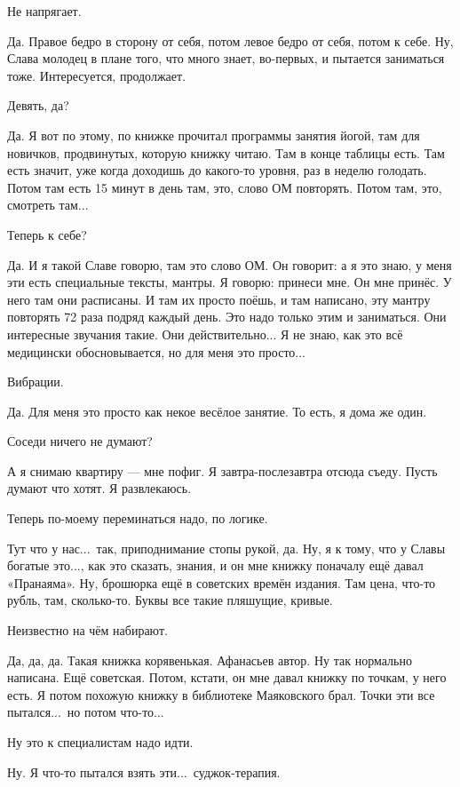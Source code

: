 \M
Не напрягает.

\I
Да. Правое бедро в сторону от себя, потом левое бедро от себя, потом к себе.
Ну, Слава молодец в плане того, что много знает, во-первых, и пытается заниматься тоже.
Интересуется, продолжает.

\M
Девять, да?

\I
Да. Я вот по этому, по книжке прочитал программы занятия йогой, там для новичков,
продвинутых, которую книжку читаю. Там в конце таблицы есть.
Там есть значит, уже когда доходишь до какого-то уровня, раз в неделю голодать.
Потом там есть 15 минут в день там, это, слово ОМ повторять.
Потом там, это, смотреть там...

\M
Теперь к себе?

\I
Да. И я такой Славе говорю, там это слово ОМ.
Он говорит: а я это знаю, у меня эти есть специальные тексты, мантры.
Я говорю: принеси мне.
Он мне принёс. У него там они расписаны.
И там их просто поёшь, и там написано, эту мантру повторять 72 раза подряд каждый день.
Это надо только этим и заниматься. Они интересные звучания такие.
Они действительно... Я не знаю, как это всё медицински обосновывается, но для меня это просто...

\M
Вибрации.

\I
Да. Для меня это просто как некое весёлое занятие. То есть, я дома же один.

\M
Соседи ничего не думают?

\I
А я снимаю квартиру --- мне пофиг.
Я завтра-послезавтра отсюда съеду. Пусть думают что хотят.
Я развлекаюсь.

\M
Теперь по-моему переминаться надо, по логике.

\I
Тут что у нас...\ так, приподнимание стопы рукой, да.
Ну, я к тому, что у Славы богатые это..., как это сказать, знания, и он мне книжку поначалу
ещё давал «Пранаяма». Ну, брошюрка ещё в советских времён издания. Там цена, что-то рубль, там,
сколько-то. Буквы все такие пляшущие, кривые.

\M
Неизвестно на чём набирают.

\I
Да, да, да. Такая книжка корявенькая.
Афанасьев автор. Ну так нормально написана. Ещё советская.
Потом, кстати, он мне давал книжку по точкам, у него есть.
Я потом похожую книжку в
библиотеке Маяковского брал. Точки эти все пытался...\ но потом что-то...

\M
Ну это к специалистам надо идти.

\I
Ну. Я что-то пытался взять эти...\ суджок-терапия.

